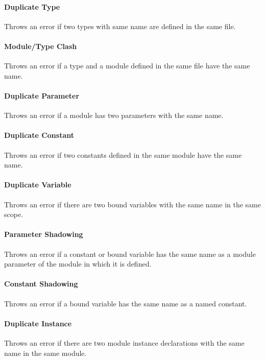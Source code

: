 \documentclass[a4paper,11pt,twoside]{report}
\begin{document}
{{{\paragraph{Duplicate Type}
Throws an error if two types with same name are defined in the same file.

\paragraph{Module/Type Clash}
Throws an error if a type and a module defined in the same file have the same name.

\paragraph{Duplicate Parameter}
Throws an error if a module has two parameters with the same name.

\paragraph{Duplicate Constant}
Throws an error if two constants defined in the same module have the same name.

\paragraph{Duplicate Variable}
Throws an error if there are two bound variables with the same name in the same scope.

\paragraph{Parameter Shadowing}
Throws an error if a constant or bound variable has the same name as a module parameter of the module in which it is defined.

\paragraph{Constant Shadowing}
Throws an error if a bound variable has the same name as a named constant.

\paragraph{Duplicate Instance}
Throws an error if there are two module instance declarations with the same name in the same module.

}}}
\end{document}
